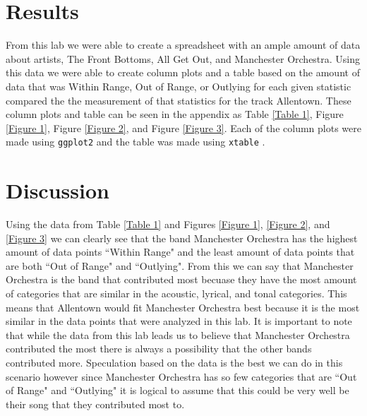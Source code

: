 \documentclass{article}\usepackage[]{graphicx}\usepackage[]{xcolor}
\begin{document}
\begin{multicols}{2}
\section{Results}
From this lab we were able to create a spreadsheet with an
ample amount of data about artists, The Front Bottoms, All
Get Out, and Manchester Orchestra. Using this data we were
able to create column plots and a table based on the amount of data that was Within Range, Out of Range, or Outlying for each given statistic compared the the measurement of that statistics for the track Allentown. These column plots and table can be seen in the appendix as Table \ref{Table 1}, Figure \ref{Figure 1}, Figure \ref{Figure 2}, and Figure \ref{Figure 3}. Each of the column plots were made using \texttt{ggplot2} and the table was made using \texttt{xtable} \citep{ggplot} \citep{xtable}.


\section{Discussion}

Using the data from Table \ref{Table 1} and Figures \ref{Figure 1}, \ref{Figure 2}, and \ref{Figure 3} we can clearly see that the band Manchester Orchestra has the highest amount of data points ``Within Range" and the least amount of data points that are both ``Out of Range" and ``Outlying". From this we can say that Manchester Orchestra is the band that contributed most becuase they have the most amount of categories that are similar in the acoustic, lyrical, and tonal categories. This means that Allentown would fit Manchester Orchestra best because it is the most similar in the data points that were analyzed in this lab. It is important to note that while the data from this lab leads us to believe that Manchester Orchestra contributed the most there is always a possibility that the other bands contributed more. Speculation based on the data is the best we can do in this scenario however since Manchester Orchestra has so few categories that are ``Out of Range" and ``Outlying" it is logical to assume that this could be very well be their song that they contributed most to. 

\vspace{2em}


\begin{tiny}

\end{tiny}
\end{multicols}
\end{document}
